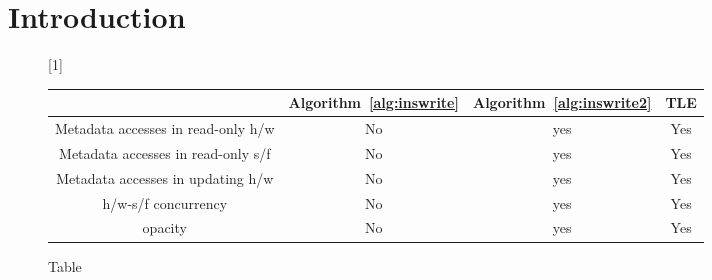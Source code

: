 \section{Introduction}
\label{sec:intro}
%


\begin{figure*}[!ht]
      
     \scalebox{1}[1]{
     \begin{tabularx}{\textwidth}{c|c|c|c}
	~~~~~ & Algorithm~\ref{alg:inswrite} & Algorithm~\ref{alg:inswrite2} & TLE\\ \hline
	Metadata accesses in read-only h/w & No & yes & Yes \\ \hline
	Metadata accesses in read-only s/f & No & yes & Yes \\ \hline
	Metadata accesses in updating h/w & No & yes & Yes \\ \hline
	h/w-s/f concurrency & No & yes & Yes \\ \hline
	opacity & No & yes & Yes 
   \end{tabularx}
\caption{Table}\label{fig:main}    
}
\end{figure*}